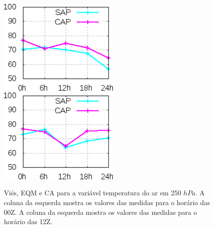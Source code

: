 \begin{figure}[!hbp]
\includegraphics[height=4.7cm]{./figs/CA250temp0Z.png}\hspace{1.0cm}\includegraphics[height=4.7cm]{./figs/CA250temp12Z.png}
\caption{Viés, EQM e CA para a variável temperatura do ar em 250 $hPa$. A coluna da esquerda mostra os valores das medidas para o horário das 00Z. A coluna da esquerda mostra os valores das medidas para o horário das 12Z.}
\label{fig57}
\end{figure}
